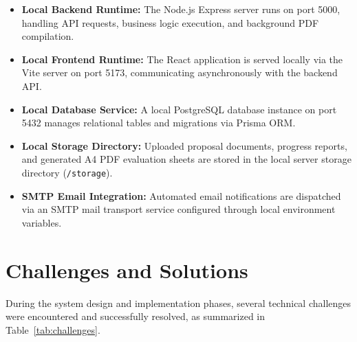 \documentclass[12pt,a4paper]{report}
\begin{document}
\begin{itemize}
  \item \textbf{Local Backend Runtime:} The Node.js Express server runs on port 5000, handling API requests, business logic execution, and background PDF compilation.
  
  \item \textbf{Local Frontend Runtime:} The React application is served locally via the Vite server on port 5173, communicating asynchronously with the backend API.
  
  \item \textbf{Local Database Service:} A local PostgreSQL database instance on port 5432 manages relational tables and migrations via Prisma ORM.
  
  \item \textbf{Local Storage Directory:} Uploaded proposal documents, progress reports, and generated A4 PDF evaluation sheets are stored in the local server storage directory (\texttt{/storage}).
  
  \item \textbf{SMTP Email Integration:} Automated email notifications are dispatched via an SMTP mail transport service configured through local environment variables.
\end{itemize}

\section{Challenges and Solutions}
During the system design and implementation phases, several technical challenges were encountered and successfully resolved, as summarized in Table~\ref{tab:challenges}.
\end{document}

